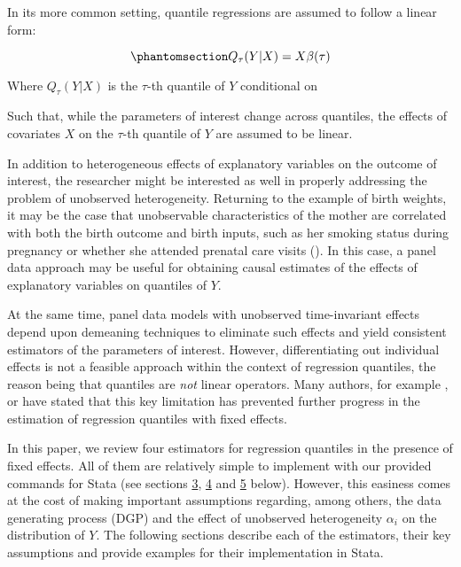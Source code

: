 \documentclass[bib]{statapress}
\begin{document}
In its more common setting, quantile regressions are assumed to follow a
linear form:

\begin{equation}\phantomsection\label{eq-qr}{
Q_{\tau}(Y | X) =  X \beta(\tau)
}\end{equation}

Where \(Q_{\tau}(Y | X)\) is the \(\tau\)-th quantile of \(Y\)
conditional on

Such that, while the parameters of interest change across quantiles, the
effects of covariates \(X\) on the \(\tau\)-th quantile of \(Y\) are
assumed to be linear.

In addition to heterogeneous effects of explanatory variables on the
outcome of interest, the researcher might be interested as well in
properly addressing the problem of unobserved heterogeneity. Returning
to the example of birth weights, it may be the case that unobservable
characteristics of the mother are correlated with both the birth outcome
and birth inputs, such as her smoking status during pregnancy or whether
she attended prenatal care visits (\citep{abrevaya2008}). In this case,
a panel data approach may be useful for obtaining causal estimates of
the effects of explanatory variables on quantiles of \(Y\).

At the same time, panel data models with unobserved time-invariant
effects depend upon demeaning techniques to eliminate such effects and
yield consistent estimators of the parameters of interest. However,
differentiating out individual effects is not a feasible approach within
the context of regression quantiles, the reason being that quantiles are
\emph{not} linear operators. Many authors, for example
\citep{abrevaya2008}, \citep{canay2011} or \citep{mss2019} have stated
that this key limitation has prevented further progress in the
estimation of regression quantiles with fixed effects.

In this paper, we review four estimators for regression quantiles in the
presence of fixed effects. All of them are relatively simple to
implement with our provided commands for Stata (see sections
\hyperref[sec:cre]{3}, \hyperref[sec:canay]{4} and
\hyperref[sec:mmqreg]{5} below). However, this easiness comes at the
cost of making important assumptions regarding, among others, the data
generating process (DGP) and the effect of unobserved heterogeneity
\(\alpha_i\) on the distribution of \(Y\). The following sections
describe each of the estimators, their key assumptions and provide
examples for their implementation in Stata.
\end{document}

